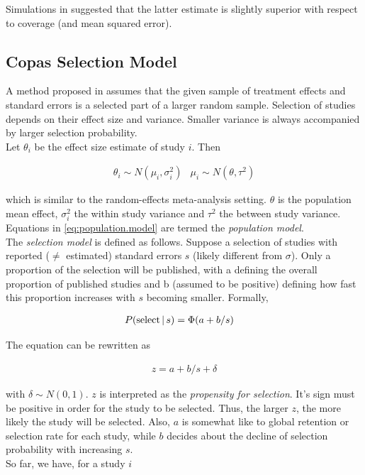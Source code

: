 \documentclass[11pt,a4paper,twoside]{book}\usepackage[]{graphicx}\usepackage[]{color}
\begin{document}
Simulations in \citet{limitmeta} suggested that the latter estimate is slightly superior with respect to coverage (and mean squared error).



\subsection{Copas Selection Model} \label{sec:copas}

A method proposed in \cite{Copas1,Copas2,Copas3} 
assumes that the given sample of treatment effects and standard errors is a selected part of a larger random sample. Selection of studies depends on their effect size and variance. Smaller variance is always accompanied by larger selection probability. \\
Let $\theta_i$ be the effect size estimate of study $i$. Then 

\begin{align}
\theta_i \sim N(\mu_i, \sigma_i^2) &
\mu_i \sim N(\theta, \tau^2) \label{eq:population.model}
\end{align}

which is similar to the random-effects meta-analysis setting. $\theta$ is the population mean effect, $\sigma_i^2$ the within study variance and $\tau^2$ the between study variance. Equations in \ref{eq:population.model} are termed the \textit{population model}. \\
The \textit{selection model} is defined as follows. Suppose a selection of studies with reported ($\neq$ estimated) standard errors $s$ (likely different from $\sigma$). Only a proportion of the selection will be published, with a defining the overall proportion of published studies and b (assumed to be positive) defining how fast this proportion increases with $s$ becoming smaller. Formally,

\begin{align}
P(\textrm{select}\given s) &= \Phi(a + b/s) \nonumber %
\end{align}

The equation can be rewritten as 

\begin{align}
z = a + b/s + \delta \nonumber %
\end{align}

with $\delta \sim N(0,1)$. $z$ is interpreted as the \textit{propensity for selection}. It's sign must be positive in order for the study to be selected. Thus, the larger $z$, the more likely the study will be selected. Also, $a$ is somewhat like to global retention or selection rate for each study, while $b$ decides about the decline of selection probability with increasing $s$.\\
So far, we have, for a study $i$
\end{document}

